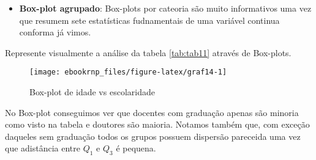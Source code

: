\documentclass[12pt,]{style/krantz}
\makeatletter
\newenvironment{Shaded}{\begin{snugshade}}{\end{snugshade}}
\newcommand{\DataTypeTok}[1]{\textcolor[rgb]{0.13,0.29,0.53}{#1}}
\newcommand{\KeywordTok}[1]{\textcolor[rgb]{0.13,0.29,0.53}{\textbf{#1}}}
\newcommand{\NormalTok}[1]{#1}
\newcommand{\OperatorTok}[1]{\textcolor[rgb]{0.81,0.36,0.00}{\textbf{#1}}}
\newcommand{\OtherTok}[1]{\textcolor[rgb]{0.56,0.35,0.01}{#1}}
\newcommand{\StringTok}[1]{\textcolor[rgb]{0.31,0.60,0.02}{#1}}
\providecommand{\tightlist}{%
  \setlength{\itemsep}{0pt}\setlength{\parskip}{0pt}}
\newenvironment{kframe}{%
\medskip{}
\setlength{\fboxsep}{.8em}
 \def\at@end@of@kframe{}%
 \ifinner\ifhmode%
  \def\at@end@of@kframe{\end{minipage}}%
  \begin{minipage}{\columnwidth}%
 \fi\fi%
 \def\FrameCommand##1{\hskip\@totalleftmargin \hskip-\fboxsep
 \colorbox{shadecolor}{##1}\hskip-\fboxsep
     \hskip-\linewidth \hskip-\@totalleftmargin \hskip\columnwidth}%
 \MakeFramed {\advance\hsize-\width
   \@totalleftmargin\z@ \linewidth\hsize
   \@setminipage}}%
 {\par\unskip\endMakeFramed%
 \at@end@of@kframe}
\renewenvironment{Shaded}{\begin{kframe}}{\end{kframe}}
\theoremstyle{definition}
\theoremstyle{definition}
\theoremstyle{definition}
\theoremstyle{remark}
\let\BeginKnitrBlock\begin \let\EndKnitrBlock\end
\makeatother
\begin{document}
\begin{itemize}
\tightlist
\item
  \textbf{Box-plot agrupado}: Box-plots por cateoria são muito informativos uma vez que resumem sete estatísticas fudnamentais de uma variável continua conforma já vimos.
\end{itemize}

\BeginKnitrBlock{example}
\protect\hypertarget{exm:unnamed-chunk-62}{}{\label{exm:unnamed-chunk-62} }Represente visualmente a análise da tabela \ref{tab:tab11} através de Box-plots.
\EndKnitrBlock{example}

\begin{Shaded}
\end{Shaded}

\begin{figure}[H]

{\centering \texttt{[image: ebookrnp\_files/figure-latex/graf14-1]} 

}

\caption{Box-plot de idade vs escolaridade}\label{fig:graf14}
\end{figure}

No Box-plot conseguimos ver que docentes com graduação apenas são minoria como visto na tabela e doutores são maioria. Notamos também que, com exceção daqueles sem graduação todos os grupos possuem dispersão pareceida uma vez que adistância entre \(Q_1\) e \(Q_3\) é pequena.
\end{document}

